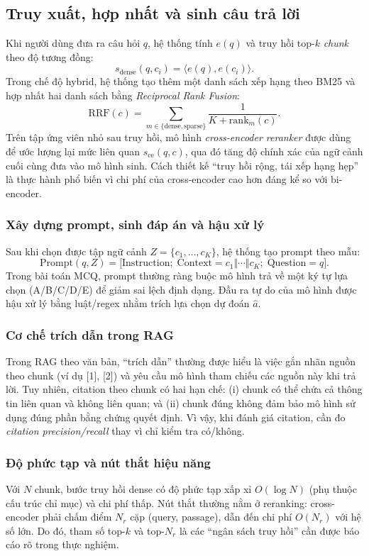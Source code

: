 \documentclass[a4paper,12pt,twoside]{report}
\begin{document}
\subsection{Truy xuất, hợp nhất và sinh câu trả lời}
Khi người dùng đưa ra câu hỏi \(q\), hệ thống tính \(e(q)\) và truy hồi top-\(k\) \textit{chunk} theo độ tương đồng:
\[
  s_{\text{dense}}(q,c_i)=\langle e(q), e(c_i)\rangle.
\]
Trong chế độ hybrid, hệ thống tạo thêm một danh sách xếp hạng theo BM25 và hợp nhất hai danh sách bằng \textit{Reciprocal Rank Fusion}:
\[
  \mathrm{RRF}(c)=\sum_{m \in \{\text{dense},\text{sparse}\}} \frac{1}{K+\mathrm{rank}_m(c)}.
\]
Trên tập ứng viên nhỏ sau truy hồi, mô hình \textit{cross-encoder reranker} được dùng để ước lượng lại mức liên quan \(s_{\text{ce}}(q,c)\), qua đó tăng độ chính xác của ngữ cảnh cuối cùng đưa vào mô hình sinh. Cách thiết kế ``truy hồi rộng, tái xếp hạng hẹp'' là thực hành phổ biến vì chi phí của cross-encoder cao hơn đáng kể so với bi-encoder.

\subsubsection{Xây dựng prompt, sinh đáp án và hậu xử lý}
Sau khi chọn được tập ngữ cảnh \(Z=\{c_1,\ldots,c_K\}\), hệ thống tạo prompt theo mẫu:
\[
  \text{Prompt}(q,Z)=\big[\text{Instruction};\; \text{Context}=c_1\Vert\cdots\Vert c_K;\; \text{Question}=q\big].
\]
Trong bài toán MCQ, prompt thường ràng buộc mô hình trả về một ký tự lựa chọn (A/B/C/D/E) để giảm sai lệch định dạng. Đầu ra tự do của mô hình được hậu xử lý bằng luật/regex nhằm trích lựa chọn dự đoán \(\hat{a}\).

\subsubsection{Cơ chế trích dẫn trong RAG}
Trong RAG theo văn bản, ``trích dẫn'' thường được hiểu là việc gắn nhãn nguồn theo chunk (ví dụ [1], [2]) và yêu cầu mô hình tham chiếu các nguồn này khi trả lời. Tuy nhiên, citation theo chunk có hai hạn chế: (i) chunk có thể chứa cả thông tin liên quan và không liên quan; và (ii) chunk đúng không đảm bảo mô hình sử dụng đúng phần bằng chứng quyết định. Vì vậy, khi đánh giá citation, cần đo \textit{citation precision/recall} thay vì chỉ kiểm tra có/không.

\subsubsection{Độ phức tạp và nút thắt hiệu năng}
Với \(N\) chunk, bước truy hồi dense có độ phức tạp xấp xỉ \(O(\log N)\) (phụ thuộc cấu trúc chỉ mục) và chi phí thấp. Nút thắt thường nằm ở reranking: cross-encoder phải chấm điểm \(N_r\) cặp (query, passage), dẫn đến chi phí \(O(N_r)\) với hệ số lớn. Do đó, tham số top-\(k\) và top-\(N_r\) là các ``ngân sách truy hồi'' cần được báo cáo rõ trong thực nghiệm.
\end{document}
